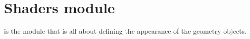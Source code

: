 % 

\chapter{Shaders module}

 is the module that is all about defining the appearance of the geometry objects.